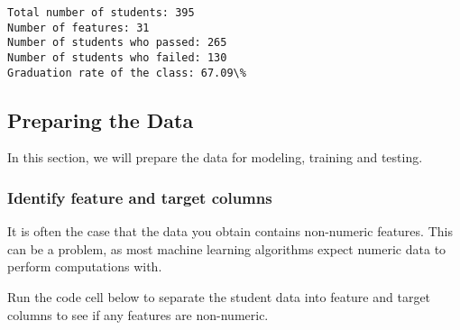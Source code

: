\documentclass{ctexart}
\begin{document}
    \begin{Verbatim}[commandchars=\\\{\}]
Total number of students: 395
Number of features: 31
Number of students who passed: 265
Number of students who failed: 130
Graduation rate of the class: 67.09\%
    \end{Verbatim}

    \subsection{Preparing the Data}\label{preparing-the-data}

In this section, we will prepare the data for modeling, training and
testing.

\subsubsection{Identify feature and target
columns}\label{identify-feature-and-target-columns}

It is often the case that the data you obtain contains non-numeric
features. This can be a problem, as most machine learning algorithms
expect numeric data to perform computations with.

Run the code cell below to separate the student data into feature and
target columns to see if any features are non-numeric.
\end{document}
